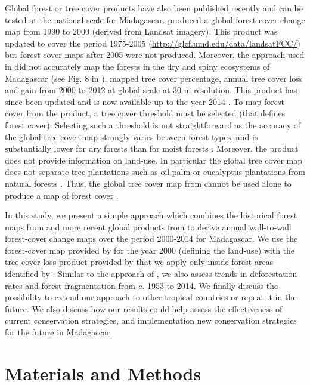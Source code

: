 \documentclass[a4paper, 12pt, leqno]{article} %
\begin{document}
Global forest or tree cover products have also been published recently
and can be tested at the national scale for
Madagascar. \citet{Kim2014} produced a global forest-cover change map
from 1990 to 2000 (derived from Landsat imagery). This product was
updated to cover the period 1975-2005
(\url{http://glcf.umd.edu/data/landsatFCC/}) but forest-cover maps
after 2005 were not produced. Moreover, the approach used in
\citet{Kim2014} did not accurately map the forests in the dry and
spiny ecosystems of Madagascar (see Fig. 8 in \citet{Kim2014}).
\citet{Hansen2013} mapped tree cover percentage, annual tree cover
loss and gain from 2000 to 2012 at global scale at 30 m
resolution. This product has since been updated and is now available
up to the year 2014 \citep{Hansen2013}. To map forest cover from the
\citet{Hansen2013} product, a tree cover threshold must be selected
(that defines forest cover). Selecting such a threshold is not
straightforward as the accuracy of the global tree cover map strongly
varies between forest types, and is substantially lower for dry
forests than for moist forests \citep{Bastin2017}. Moreover, the
\citet{Hansen2013} product does not provide information on
land-use. In particular the global tree cover map does not separate
tree plantations such as oil palm or eucalyptus plantations from
natural forests \citep{Tropek2014}. Thus, the global tree cover map
from \citet{Hansen2013} cannot be used alone to produce a map of
forest cover \citep{Tyukavina2017}.

In this study, we present a simple approach which combines the
historical forest maps from \citet{Harper2007} and more recent global
products from \citet{Hansen2013} to derive annual wall-to-wall
forest-cover change maps over the period 2000-2014 for Madagascar. We
use the forest-cover map provided by \citet{Harper2007} for the year
2000 (defining the land-use) with the tree cover loss product provided
by \citet{Hansen2013} that we apply only inside forest areas
identified by \citet{Harper2007}. Similar to the approach of
\citet{Harper2007}, we also assess trends in deforestation rates and
forest fragmentation from \emph{c.} 1953 to 2014. We finally discuss
the possibility to extend our approach to other tropical countries or
repeat it in the future. We also discuss how our results could help
assess the effectiveness of current conservation strategies, and
implementation new conservation strategies for the future in
Madagascar.

\newpage

\section{Materials and Methods}
\label{materials-and-methods}
\end{document}
